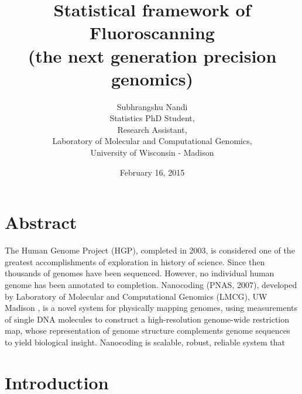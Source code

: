 \documentclass[11pt]{extarticle} %
\begin{document}

\title{Statistical framework of Fluoroscanning \\ (the next generation precision genomics)}
\author{{\Large{Subhrangshu Nandi}}\\
  Statistics PhD Student, \\
  Research Assistant, \\
  Laboratory of Molecular and Computational Genomics, \\
  University of Wisconsin - Madison}
\date{February 16, 2015}

\maketitle

\section*{Abstract}
The Human Genome Project (HGP), completed in 2003, is considered one of the greatest accomplishments of exploration in history of science. Since then thousands of genomes have been sequenced. However, no individual human genome has been annotated to completion. Nanocoding \cite{Jo_etal_2007_PNAS} (PNAS, 2007), developed by Laboratory of Molecular and Computational Genomics (LMCG), UW Madison , is a novel system for physically mapping genomes, using measurements of single DNA molecules to construct a high-resolution genome-wide restriction map, whose representation of genome structure complements genome sequences to yield biological insight. Nanocoding is scalable, robust, reliable system that

\newpage

\tableofcontents
\newpage

\newpage

\section{Introduction}
\end{document}

